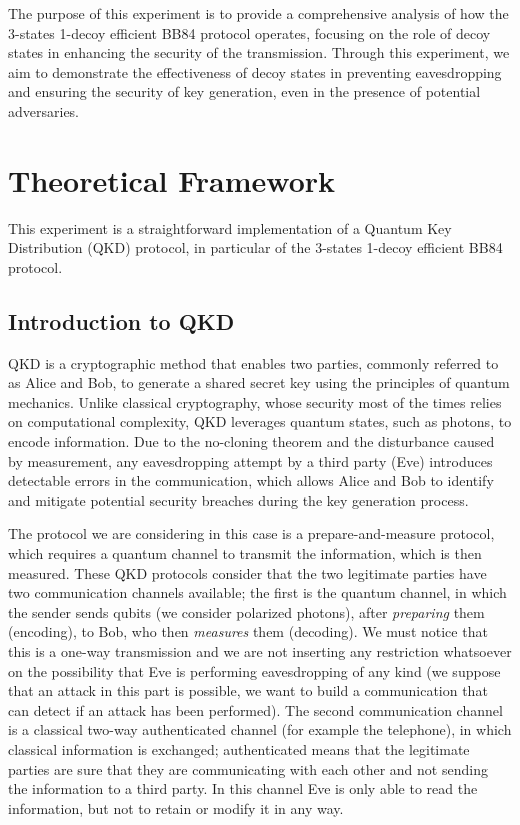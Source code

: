 \documentclass[prl,twocolumn]{revtex4-1}
\begin{document}
The purpose of this experiment is to provide a comprehensive analysis of how the 3-states 1-decoy efficient BB84 protocol operates, focusing on the role of decoy states in enhancing the security of the transmission. Through this experiment, we aim to demonstrate the effectiveness of decoy states in preventing eavesdropping and ensuring the security of key generation, even in the presence of potential adversaries.

\section{Theoretical Framework}
This experiment is a straightforward implementation of a Quantum Key Distribution (QKD) protocol, in particular of the 3-states 1-decoy efficient BB84 protocol.

\subsection{Introduction to QKD}
\label{sec:QKD}
QKD is a cryptographic method that enables two parties, commonly referred to as Alice and Bob, to generate a shared secret key using the principles of quantum mechanics. Unlike classical cryptography, whose security most of the times relies on computational complexity, QKD leverages quantum states, such as photons, to encode information. Due to the no-cloning theorem and the disturbance caused by measurement, any eavesdropping attempt by a third party (Eve) introduces detectable errors in the communication, which allows Alice and Bob to identify and mitigate potential security breaches during the key generation process.

The protocol we are considering in this case is a prepare-and-measure protocol, which requires a quantum channel to transmit the information, which is then measured. These QKD protocols consider that the two legitimate parties have two communication channels available; the first is the quantum channel, in which the sender sends qubits (we consider polarized photons), after \textit{preparing} them (encoding), to Bob, who then \emph{measures} them (decoding). We must notice that this is a one-way transmission and we are not inserting any restriction whatsoever on the possibility that Eve is performing eavesdropping of any kind (we suppose that an attack in this part is possible, we want to build a communication that can detect if an attack has been performed).
The second communication channel is a classical two-way authenticated channel (for example the telephone), in which classical information is exchanged; authenticated means that the legitimate parties are sure that they are communicating with each other and not sending the information to a third party. In this channel Eve is only able to read the information, but not to retain or modify it in any way.
\end{document}
